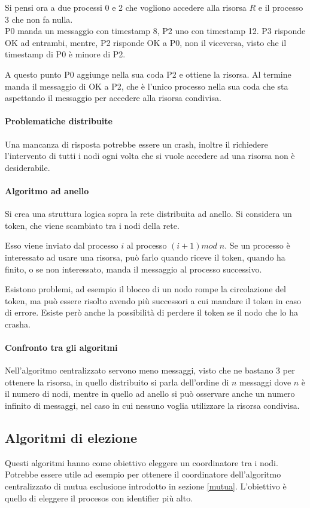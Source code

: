 Si pensi ora a due processi 0 e 2 che vogliono accedere 
alla risorsa $R$ e il processo 3 che non fa nulla.\\
P0 manda un messaggio con timestamp 8, P2 uno con timestamp 12.
P3 risponde OK ad entrambi, mentre, P2 risponde OK a P0, 
non il viceversa, visto che il timestamp di P0 è minore di P2.

A questo punto P0 aggiunge nella sua coda P2 e ottiene la 
risorsa. Al termine manda il messaggio di OK a P2, che è l'unico 
processo nella sua coda che sta aspettando il messaggio 
per accedere alla risorsa condivisa.

\paragraph{Problematiche distribuite}
Una mancanza di risposta potrebbe essere un crash, 
inoltre il richiedere l'intervento di tutti 
i nodi ogni volta che si vuole accedere ad una risorsa non è
desiderabile.

\paragraph{Algoritmo ad anello}
Si crea una struttura logica sopra la rete distribuita ad anello.
Si considera un token, che viene scambiato tra i nodi della rete.

Esso viene inviato dal processo $i$ al processo $(i+1)\mathit{mod\;}n$.
Se un processo è interessato ad usare una risorsa, può farlo 
quando riceve il token, quando ha finito, o se non interessato, 
manda il messaggio al processo successivo.

Esistono problemi, ad esempio il blocco di un nodo 
rompe la circolazione del token, ma può essere risolto avendo più 
successori a cui mandare il token in caso di errore. Esiste però 
anche la possibilità di perdere il token se il nodo che lo ha crasha.

\paragraph{Confronto tra gli algoritmi}
Nell'algoritmo centralizzato servono meno messaggi, visto che ne bastano 
3 per ottenere la risorsa, in quello distribuito si parla 
dell'ordine di $n$ messaggi dove $n$ è il numero di nodi, 
mentre in quello ad anello si può osservare anche un numero 
infinito di messaggi, nel caso in cui nessuno voglia utilizzare 
la risorsa condivisa.

\subsection{Algoritmi di elezione}
Questi algoritmi hanno come obiettivo eleggere un coordinatore 
tra i nodi. 
Potrebbe essere utile ad esempio per ottenere il coordinatore dell'algoritmo 
centralizzato di mutua esclusione introdotto in sezione \vref{mutua}.
L'obiettivo è quello di eleggere il procesos con identifier più alto.

